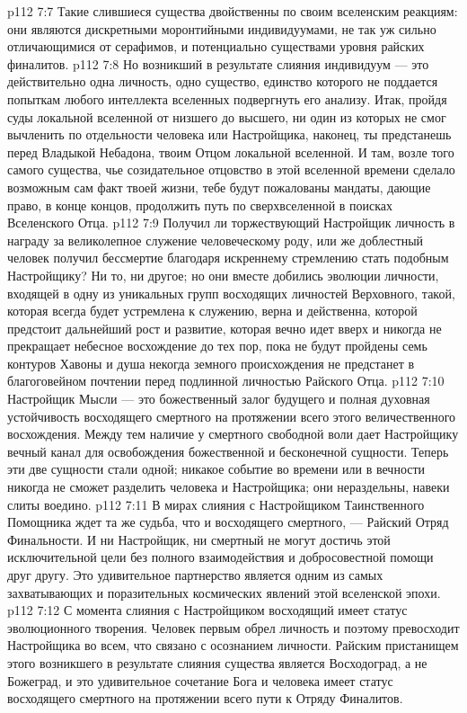 \vs p112 7:7 \pc Такие слившиеся существа двойственны по своим вселенским реакциям: они являются дискретными моронтийными индивидуумами, не так уж сильно отличающимися от серафимов, и потенциально существами уровня райских финалитов.
\vs p112 7:8 Но возникший в результате слияния индивидуум --- это действительно одна личность, одно существо, единство которого не поддается попыткам любого интеллекта вселенных подвергнуть его анализу. Итак, пройдя суды локальной вселенной от низшего до высшего, ни один из которых не смог вычленить по отдельности человека или Настройщика, наконец, ты предстанешь перед Владыкой Небадона, твоим Отцом локальной вселенной. И там, возле того самого существа, чье созидательное отцовство в этой вселенной времени сделало возможным сам факт твоей жизни, тебе будут пожалованы мандаты, дающие право, в конце концов, продолжить путь по сверхвселенной в поисках Вселенского Отца.
\vs p112 7:9 Получил ли торжествующий Настройщик личность в награду за великолепное служение человеческому роду, или же доблестный человек получил бессмертие благодаря искреннему стремлению стать подобным Настройщику? Ни то, ни другое; но они вместе добились эволюции личности, входящей в одну из уникальных групп восходящих личностей Верховного, такой, которая всегда будет устремлена к служению, верна и действенна, которой предстоит дальнейший рост и развитие, которая вечно идет вверх и никогда не прекращает небесное восхождение до тех пор, пока не будут пройдены семь контуров Хавоны и душа некогда земного происхождения не предстанет в благоговейном почтении перед подлинной личностью Райского Отца.
\vs p112 7:10 Настройщик Мысли --- это божественный залог будущего и полная духовная устойчивость восходящего смертного на протяжении всего этого величественного восхождения. Между тем наличие у смертного свободной воли дает Настройщику вечный канал для освобождения божественной и бесконечной сущности. Теперь эти две сущности стали одной; никакое событие во времени или в вечности никогда не сможет разделить человека и Настройщика; они нераздельны, навеки слиты воедино.
\vs p112 7:11 \pc В мирах слияния с Настройщиком Таинственного Помощника ждет та же судьба, что и восходящего смертного, --- Райский Отряд Финальности. И ни Настройщик, ни смертный не могут достичь этой исключительной цели без полного взаимодействия и добросовестной помощи друг другу. Это удивительное партнерство является одним из самых захватывающих и поразительных космических явлений этой вселенской эпохи.
\vs p112 7:12 С момента слияния с Настройщиком восходящий имеет статус эволюционного творения. Человек первым обрел личность и поэтому превосходит Настройщика во всем, что связано с осознанием личности. Райским пристанищем этого возникшего в результате слияния существа является Восходоград, а не Божеград, и это удивительное сочетание Бога и человека имеет статус восходящего смертного на протяжении всего пути к Отряду Финалитов.
